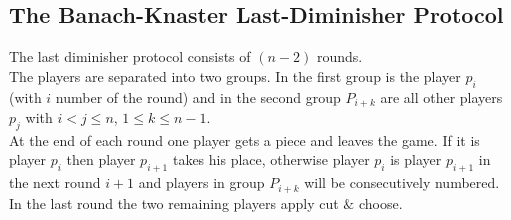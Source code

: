 \subsection{The Banach-Knaster Last-Diminisher Protocol}

The last diminisher protocol consists of $(n-2)$ rounds.\\The players are separated into two groups. In the first group is the player $p_i$ (with $i$ number of the round) and in the second group $P_{i+k}$ are all other players $p_j$ with $i <j\leq n$, $1\leq k \leq n-1$.\\ At the end of each round one player gets a piece and leaves the game. If it is player $p_i$ then player $p_{i+1}$ takes his place, otherwise player $p_i$ is player $p_{i+1}$ in the next round $i+1$ and players in group $P_{i+k}$ will be consecutively numbered. In the last round the two remaining players apply cut $\&$ choose. 

